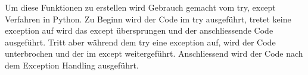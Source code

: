 Um diese Funktionen zu erstellen wird Gebrauch gemacht vom try, except Verfahren in Python. Zu Beginn wird der Code im try ausgeführt, tretet keine exception auf wird das except übersprungen und der anschliessende Code ausgeführt. Tritt aber während dem try eine exception auf, wird der Code unterbrochen und der im except weitergeführt. Anschliessend wird der Code nach dem Exception Handling ausgeführt.\cite{ThePythonTutorial8.ErrorsAndExceptions:Python}
